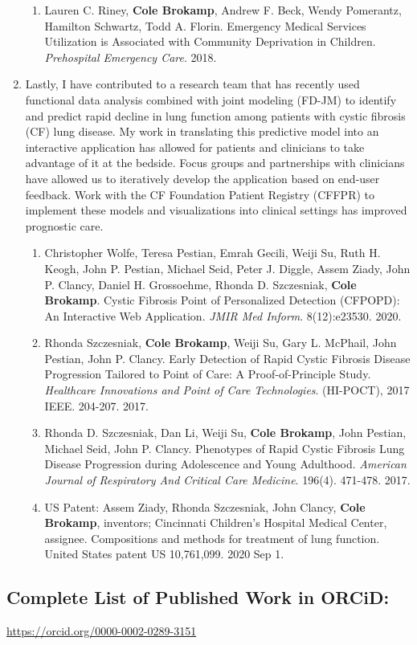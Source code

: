 \documentclass{nihbiosketch}
\begin{document}
\begin{enumerate}
\begin{enumerate}
	\item Lauren C. Riney, \textbf{Cole Brokamp}, Andrew F. Beck, Wendy Pomerantz,
    Hamilton Schwartz, Todd A. Florin. Emergency Medical Services Utilization is
    Associated with Community Deprivation in Children. \textit{Prehospital
      Emergency Care}. 2018.

\end{enumerate}

\item Lastly, I have contributed to a research team that has recently used
  functional data analysis combined with joint modeling (FD-JM) to identify and
  predict rapid decline in lung function among patients with cystic fibrosis
  (CF) lung disease. My work in translating this predictive model into an interactive application has allowed for patients and clinicians to take advantage of it at the bedside.  Focus groups and partnerships with clinicians have allowed us to iteratively develop the application based on end-user feedback. Work with the CF Foundation Patient Registry (CFFPR) to implement these models and visualizations into clinical settings has improved prognostic care.

\begin{enumerate}

  \item Christopher Wolfe, Teresa Pestian, Emrah Gecili, Weiji Su, Ruth H. Keogh, John P. Pestian, Michael Seid, Peter J. Diggle, Assem Ziady, John P. Clancy, Daniel H. Grossoehme, Rhonda D. Szczesniak, \textbf{Cole Brokamp}. Cystic Fibrosis Point of Personalized Detection (CFPOPD): An Interactive Web Application. \emph{JMIR Med Inform}. 8(12):e23530. 2020.

  \item Rhonda Szczesniak, \textbf{Cole Brokamp}, Weiji Su, Gary L. McPhail, John Pestian, John P. Clancy. Early Detection of Rapid Cystic Fibrosis Disease Progression Tailored to Point of Care: A Proof-of-Principle Study. \textit{Healthcare Innovations and Point of Care Technologies}. (HI-POCT), 2017 IEEE. 204-207. 2017.

  \item Rhonda D. Szczesniak, Dan Li, Weiji Su, \textbf{Cole Brokamp}, John Pestian, Michael Seid, John P. Clancy. Phenotypes of Rapid Cystic Fibrosis Lung Disease Progression during Adolescence and Young Adulthood. \textit{American Journal of Respiratory And Critical Care Medicine}. 196(4). 471-478. 2017.

\item US Patent: Assem Ziady, Rhonda Szczesniak, John Clancy, \textbf{Cole Brokamp}, inventors; Cincinnati Children's Hospital Medical Center, assignee. Compositions and methods for treatment of lung function. United States patent US 10,761,099. 2020 Sep 1.

\end{enumerate}

\end{enumerate}

\subsection*{Complete List of Published Work in ORCiD:} 
\url{https://orcid.org/0000-0002-0289-3151}
\end{document}

